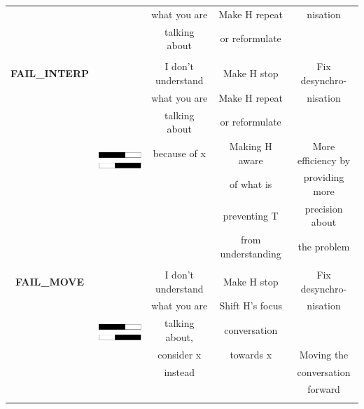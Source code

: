 \begin{table}[htp]
{\begin{tabular}{|c|c|c|c|c|}
             	& & what you are & \tabitem Make H repeat & nisation \\
           		& & talking about & or reformulate & \\
				& & & & \\
              	\hline
              	\rule{0pt}{4ex}
              	\textbf{FAIL\_INTERP} & \multirow{8}{*}{\includegraphics[scale=0.5]{figures/TTPProfiles/longBargeIn.pdf}} & I don't understand & \tabitem Make H stop & \tabitem Fix desynchro- \\
              	& & what you are & \tabitem Make H repeat & nisation \\
             	& & talking about & or reformulate & \\
             	& & because of x & \tabitem Making H aware & \tabitem More efficiency by \\
             	& & & of what is & providing more \\
               	& & & preventing T & precision about \\
              	& & & from understanding & the problem \\
				& & & & \\
               	\hline
                \rule{0pt}{4ex}
              	\textbf{FAIL\_MOVE} & \multirow{8}{*}{\includegraphics[scale=0.5]{figures/TTPProfiles/longBargeIn.pdf}} & I don't understand & \tabitem Make H stop & \tabitem Fix desynchro- \\
              	& & what you are & \tabitem Shift H's focus & nisation \\
             	& & talking about, & conversation & \\
             	& & consider x & towards x & \tabitem Moving the \\
             	& & instead & & conversation \\
               	& & & & forward \\
              	& & & & \\

\end{tabular}}
\end{table}
